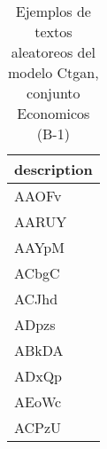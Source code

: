\begin{table}[H]
\centering
\fontsize{8}{14}\selectfont
\caption{Ejemplos de textos aleatoreos del modelo Ctgan, conjunto Economicos (B-1)}
\label{table-sample10-economicos-b-1-ctgan-text}
\begin{tabular}{|m{50em}|}
\hline
\rowcolor[gray]{0.8}
description \\
\hline AAOFv \\
\hline AARUY \\
\hline AAYpM \\
\hline ACbgC \\
\hline ACJhd \\
\hline ADpzs \\
\hline ABkDA \\
\hline ADxQp \\
\hline AEoWc \\
\hline ACPzU \\
\hline
\end{tabular}
\end{table}
